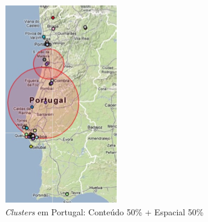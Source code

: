 \begin{figure}[h]
\begin{subfigure}[b]{.2\textwidth}
  \includegraphics[width=0.99\linewidth]{./figures/tweeprofiles/extp2}
  \caption{\textit{Clusters} em Portugal: Conteúdo 50\% + Espacial 50\%}
  \label{fig:sfig2}
\end{subfigure}
\quad
\begin{subfigure}[b]{.2\textwidth}
  \centering

\end{subfigure}
\end{figure}
